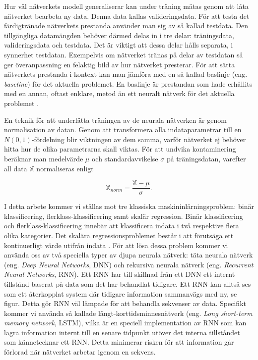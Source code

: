 Hur väl nätverkets modell generaliserar kan under träning mätas genom att låta nätverket bearbeta ny data. Denna data kallas valideringsdata. För att testa det färdigtränade nätverkets prestanda använder man sig av så kallad testdata. Den tillgängliga datamängden behöver därmed delas in i tre delar: träningsdata, valideringsdata och testdata. Det är viktigt att dessa delar hålls separata, i synnerhet testdatan. Exempelvis om nätverket tränas på delar av testdatan så ger överanpassning en felaktig bild av hur nätverket presterar.
För att sätta nätverkets prestanda i kontext kan man jämföra med en så kallad baslinje (eng. \emph{baseline}) för det aktuella problemet. En baslinje är prestandan som hade erhållits med en annan, oftast enklare, metod än ett neuralt nätverk för det aktuella problemet \cite{Chollet}.

En teknik för att underlätta träningen av de neurala nätverken är genom normalisation av datan. Genom att transformera alla indataparametrar till en $N(0,1)$-fördelning blir viktningen av dem samma, varför nätverket ej behöver hitta hur de olika parametrarna skall viktas. För att undvika kontaminering beräknar man medelvärde $\mu$ och standardavvikelse $\sigma$ på träningsdatan, varefter all data $\mathbb{X}$ normaliseras enligt \cite{Chollet}

\begin{equation}
    \mathbb{X}_{norm} = \frac{\mathbb{X}-\mu}{\sigma}.
    \label{normalization}
\end{equation}

I detta arbete kommer vi ställas mot tre klassiska maskininlärningsproblem: binär klassificering, flerklass-klassificering samt skalär regression. Binär klassificering och flerklass-klassificering innebär att klassificera indata i två respektive flera olika kategorier. Det skalära regressionsproblemet består i att förutsäga ett kontinuerligt värde utifrån indata \cite{Chollet}. För att lösa dessa problem kommer vi använda oss av två speciella typer av djupa neurala nätverk: täta neurala nätverk (eng. \emph{Deep Neural Networks}, DNN) och rekursiva neurala nätverk (eng. \emph{Recurrent Neural Networks}, RNN). Ett RNN har till skillnad från ett DNN ett internt tillstånd baserat på data som det har behandlat tidigare. Ett RNN kan alltså ses som ett återkopplat system där tidigare information sammanvägs med ny, se figur. Detta gör RNN väl lämpade för att behandla sekvenser av data. Specifikt kommer vi använda så kallade långt-korttidsminnesnätverk (eng. \emph{Long short-term memory network}, LSTM), vilka är en speciell implementation av RNN som kan lagra information internt till en senare tidpunkt utöver det interna tillståndet som kännetecknar ett RNN. Detta minimerar risken för att information går förlorad när nätverket arbetar igenom en sekvens.




